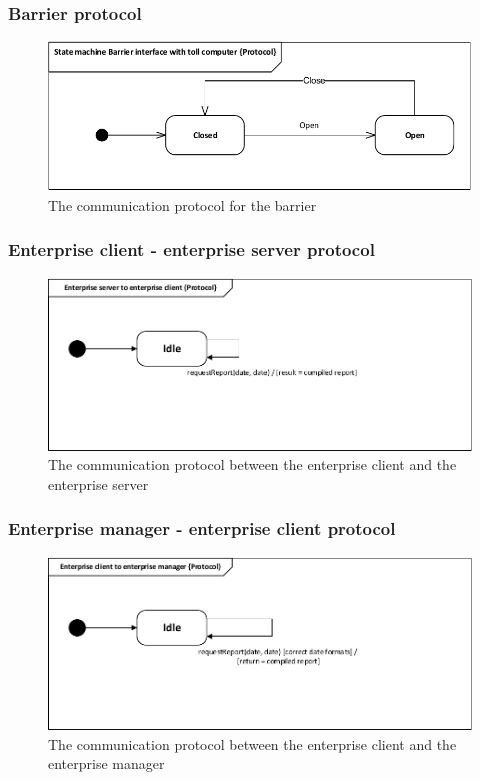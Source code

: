 \subsubsection*{Barrier protocol}
\begin{figure}[H]
\centering
\includegraphics[width=0.7\linewidth]{img/behaviour_state_machines/protocol_state_machines/protocol_state_machine_barrier}
\caption{The communication protocol for the barrier}
\label{fig:protocol_state_machine_barrier}
\end{figure}

\subsubsection*{Enterprise client - enterprise server protocol}
\begin{figure}[H]
\centering
\includegraphics[width=0.7\linewidth]{img/behaviour_state_machines/protocol_state_machines/protocol_state_machine_enterprise_server_to_enterprise_client}
\caption{The communication protocol between the enterprise client and the enterprise server}
\label{fig:protocol_state_machine_enterprise_server_to_enterprise_client}
\end{figure}

\subsubsection*{Enterprise manager - enterprise client protocol}
\begin{figure}[H]
\centering
\includegraphics[width=0.7\linewidth]{img/behaviour_state_machines/protocol_state_machines/protocol_state_machine_enterprise_client_enterprise_manager}
\caption{The communication protocol between the enterprise client and the enterprise manager}
\label{fig:protocol_state_machine_enterprise_client_enterprise_manager}
\end{figure}